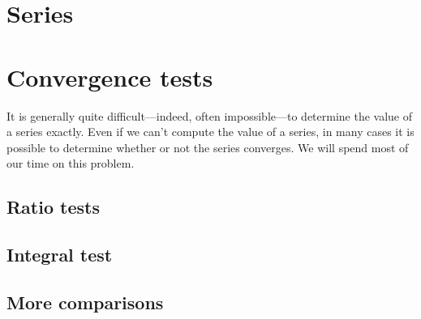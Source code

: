 \documentclass[justified]{tufte-book}
\begin{document}



\chapter{Series}
\label{chapter:series}

 


\chapter{Convergence tests}
\label{chapter:convergence-tests}


It is generally quite difficult---indeed, often impossible---to
determine the value of a series exactly.  Even if we can't compute the
value of a series, in many cases it is possible to determine whether
or not the series converges. We will spend most of our time on this
problem.


\section{Ratio tests}
\label{section:ratio-test}


\section{Integral test}
\label{section:integral-test}


\section{More comparisons}
\label{section:more-comparison-tests}

\end{document}
